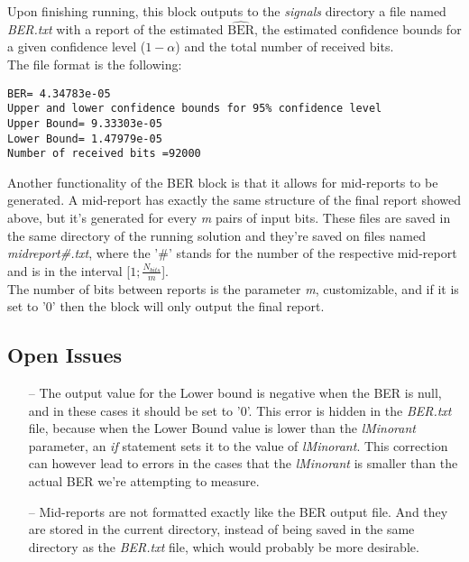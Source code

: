 \begin{refsection}
Upon finishing running, this block outputs to the \textit{signals} directory a file named \textit{BER.txt} with a report of the estimated $\widehat{\text{BER}}$, the estimated confidence bounds for a given confidence level ($1-\alpha$) and the total number of received bits.
\\
The file format is the following:
\begin{adjustwidth}{1.5cm}{}
\begin{verbatim}
BER= 4.34783e-05
Upper and lower confidence bounds for 95% confidence level
Upper Bound= 9.33303e-05
Lower Bound= 1.47979e-05
Number of received bits =92000
\end{verbatim}
\end{adjustwidth}
Another functionality of the BER block is that it allows for mid-reports to be generated. A mid-report has exactly the same structure of the final report showed above, but it's generated for every \textit{m} pairs of input bits. These files are saved in the same directory of the running solution and they're saved on files named \textit{midreport\#.txt}, where the '\#' stands for the number of the respective mid-report and is in the interval [$1;\frac{N_{bits}}{m}$].
\\
The number of bits between reports is the parameter \textit{m}, customizable, and if it is set to '0' then the block will only output the final report.

\subsection*{Open Issues}
\begin{itemize}
  \item[--] The output value for the Lower bound is negative when the BER is null, and in these cases it should be set to '0'. This error is hidden in the \textit{BER.txt} file, because when the Lower Bound value is lower than the \textit{lMinorant} parameter, an \textit{if} statement sets it to the value of \textit{lMinorant}. This correction can however lead to errors in the cases that the \textit{lMinorant} is smaller than the actual BER we're attempting to measure.

  \item[--] Mid-reports are not formatted exactly like the BER output file. And they are stored in the current directory, instead of being saved in the same directory as the \textit{BER.txt} file, which would probably be more desirable.
\end{itemize}


\end{refsection}
